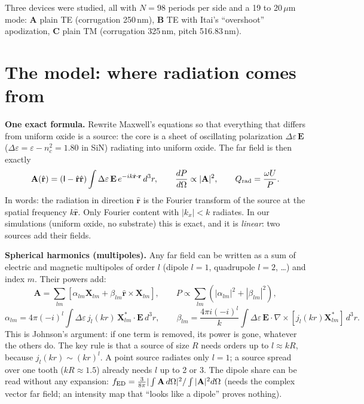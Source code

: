 \documentclass[11pt,a4paper]{article}
\begin{document}
Three devices were studied, all with $N=98$ periods per side and a 19 to 20\,$\mu$m mode:
\textbf{A} plain TE (corrugation 250\,nm), \textbf{B} TE with Itai's ``overshoot'' apodization, \textbf{C} plain TM
(corrugation 325\,nm, pitch 516.83\,nm).

\section{The model: where radiation comes from}
\textbf{One exact formula.} Rewrite Maxwell's equations so that everything that differs from uniform oxide is a source:
the core is a sheet of oscillating polarization $\Delta\varepsilon\,\mathbf E$ ($\Delta\varepsilon=\varepsilon-n_c^2=1.80$ in
SiN) radiating into uniform oxide. The far field is then exactly
\begin{equation}
\mathbf A(\hat{\mathbf r})=(\mathsf I-\hat{\mathbf r}\hat{\mathbf r})\int\Delta\varepsilon\,\mathbf E\,e^{-ik\hat{\mathbf r}\cdot\mathbf r}\,d^3r,
\qquad \frac{dP}{d\Omega}\propto|\mathbf A|^2,\qquad Q_{\rm rad}=\frac{\omega U}{P}.
\end{equation}
In words: the radiation in direction $\hat{\mathbf r}$ is the Fourier transform of the source at the spatial frequency
$k\hat{\mathbf r}$. Only Fourier content with $|k_x|<k$ radiates. In our simulations (uniform oxide, no substrate) this is
exact, and it is \emph{linear}: two sources add their fields.

\textbf{Spherical harmonics (multipoles).} Any far field can be written as a sum of electric and magnetic multipoles of
order $l$ (dipole $l=1$, quadrupole $l=2$, \dots) and index $m$. Their powers add:
\begin{equation}
\mathbf A=\sum_{lm}[\alpha_{lm}\mathbf X_{lm}+\beta_{lm}\hat{\mathbf r}\times\mathbf X_{lm}],\qquad P\propto\sum_{lm}(|\alpha_{lm}|^2+|\beta_{lm}|^2),
\end{equation}
\begin{equation}
\alpha_{lm}=4\pi(-i)^l\!\int\Delta\varepsilon\,j_l(kr)\,\mathbf X^*_{lm}\cdot\mathbf E\,d^3r,\qquad
\beta_{lm}=\frac{4\pi i(-i)^l}{k}\!\int\Delta\varepsilon\,\mathbf E\cdot\nabla\times[j_l(kr)\mathbf X^*_{lm}]\,d^3r .
\end{equation}
This is Johnson's argument: if one term is removed, its power is gone, whatever the others do. The key rule is that a
source of size $R$ needs orders up to $l\approx kR$, because $j_l(kr)\sim(kr)^l$. A point source radiates only $l=1$; a
source spread over one tooth ($kR\approx1.5$) already needs $l$ up to 2 or 3. The dipole share can be read without any
expansion: $f_{\rm ED}=\frac{3}{8\pi}|\int\mathbf A\,d\Omega|^2/\int|\mathbf A|^2d\Omega$ (needs the complex vector far field;
an intensity map that ``looks like a dipole'' proves nothing).
\end{document}
